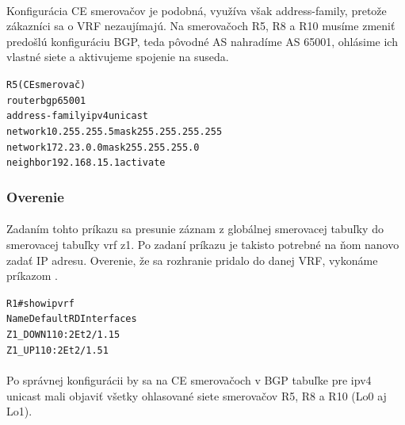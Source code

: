 \documentclass[12pt,twoside,a4paper]{report}
\begin{document}
\paragraph{}
Konfigurácia CE smerovačov je podobná, využíva však address-family, pretože zákazníci sa o VRF nezaujímajú. Na smerovačoch R5, R8 a R10 musíme zmeniť predošlú konfiguráciu BGP, teda pôvodné AS nahradíme AS 65001, ohlásime ich vlastné siete a aktivujeme spojenie na suseda.

\noindent
{\selectfont
\begin{small}
\begin{alltt}
R5 (CE smerovač)
router bgp 65001
  address-family ipv4 unicast
    network 10.255.255.5 mask 255.255.255.255
    network 172.23.0.0 mask 255.255.255.0
    neighbor 192.168.15.1 activate
\end{alltt}
\end{small}
}

\subsubsection{Overenie}
\paragraph{}
Zadaním tohto príkazu sa presunie záznam z globálnej smerovacej tabuľky do smerovacej tabuľky vrf z1. Po zadaní príkazu je takisto potrebné na ňom nanovo zadať IP adresu. Overenie, že sa rozhranie pridalo do danej VRF, vykonáme príkazom .

\noindent
{\selectfont
\begin{small}
\begin{alltt}
R1#show ip vrf
  Name                             Default RD          Interfaces  
  Z1_DOWN                               110:2            Et2/1.15
  Z1_UP                                 110:2            Et2/1.51
\end{alltt}
\end{small}
}

\paragraph{}
Po správnej konfigurácii by sa na CE smerovačoch v BGP tabuľke pre ipv4 unicast mali objaviť všetky ohlasované siete smerovačov R5, R8 a R10 (Lo0 aj Lo1).
\end{document}
